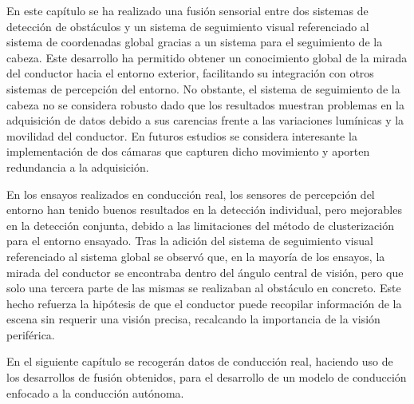 En este capítulo se ha realizado una fusión sensorial entre dos sistemas de detección de obstáculos y un sistema de seguimiento visual referenciado al sistema de coordenadas global gracias a un sistema para el seguimiento de la cabeza. Este desarrollo ha permitido obtener un conocimiento global de la mirada del conductor hacia el entorno exterior, facilitando su integración con otros sistemas de percepción del entorno. No obstante, el sistema de seguimiento de la cabeza no se considera robusto dado que los resultados muestran problemas en la adquisición de datos debido a sus carencias frente a las variaciones lumínicas y la movilidad del conductor. En futuros estudios se considera interesante la implementación de dos cámaras que capturen dicho movimiento y aporten redundancia a la adquisición.

En los ensayos realizados en conducción real, los sensores de percepción del entorno han tenido buenos resultados en la detección individual, pero mejorables en la detección conjunta, debido a las limitaciones del método de clusterización para el entorno ensayado. Tras la adición del sistema de seguimiento visual referenciado al sistema global se observó que, en la mayoría de los ensayos, la mirada del conductor se encontraba dentro del ángulo central de visión, pero que solo una tercera parte de las mismas se realizaban al obstáculo en concreto. Este hecho refuerza la hipótesis de que el conductor puede recopilar información de la escena sin requerir una visión precisa, recalcando la importancia de la visión periférica.

En el siguiente capítulo se recogerán datos de conducción real, haciendo uso de los desarrollos de fusión obtenidos, para el desarrollo de un modelo de conducción enfocado a la conducción autónoma. 
